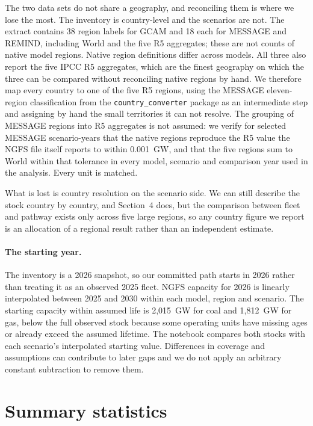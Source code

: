 \documentclass[11pt,a4paper]{article}
\begin{document}
The two data sets do not share a geography, and reconciling them is where we lose the most. The inventory is country-level and the scenarios are not. The extract contains 38 region labels for GCAM and 18 each for MESSAGE and REMIND, including World and the five R5 aggregates; these are not counts of native model regions. Native region definitions differ across models. All three also report the five IPCC R5 aggregates, which are the finest geography on which the three can be compared without reconciling native regions by hand. We therefore map every country to one of the five R5 regions, using the MESSAGE eleven-region classification from the \texttt{country\_converter} package as an intermediate step and assigning by hand the small territories it can not resolve. The grouping of MESSAGE regions into R5 aggregates is not assumed: we verify for selected MESSAGE scenario-years that the native regions reproduce the R5 value the NGFS file itself reports to within 0.001~GW, and that the five regions sum to World within that tolerance in every model, scenario and comparison year used in the analysis. Every unit is matched.

What is lost is country resolution on the scenario side. We can still describe the stock country by country, and Section~4 does, but the comparison between fleet and pathway exists only across five large regions, so any country figure we report is an allocation of a regional result rather than an independent estimate.

\paragraph{The starting year.}

The inventory is a 2026 snapshot, so our committed path starts in 2026 rather than treating it as an observed 2025 fleet. NGFS capacity for 2026 is linearly interpolated between 2025 and 2030 within each model, region and scenario. The starting capacity within assumed life is 2,015~GW for coal and 1,812~GW for gas, below the full observed stock because some operating units have missing ages or already exceed the assumed lifetime. The notebook compares both stocks with each scenario's interpolated starting value. Differences in coverage and assumptions can contribute to later gaps and we do not apply an arbitrary constant subtraction to remove them.

\section{Summary statistics}
\end{document}
